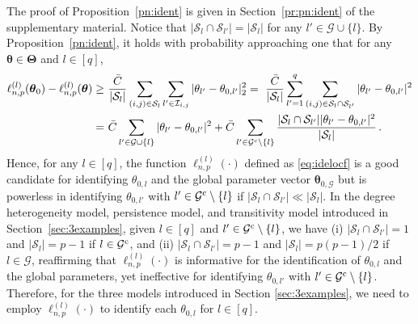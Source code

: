 \documentclass[12pt]{article}
\newcommand{\bTheta}{\boldsymbol \Theta}
\newcommand{\btheta}{\boldsymbol \theta}
\newcommand{\btc}{{\rm c}}
\newcommand{\0}{{\bf 0}}
\begin{document}
The proof of Proposition~\ref{pn:ident} is given in Section~\ref{pr:pn:ident} of the supplementary material.
Notice that $|\mathcal{S}_{ l}\cap\mathcal{S}_{l'}|=|\mathcal{S}_{ l}|$ for any $l' \in\mathcal{G} \cup \{l\}$.
By Proposition~\ref{pn:ident}, it holds with probability approaching one that for any $\btheta\in\bTheta$ and $l \in [q]$,
\begin{equation}\label{eq:ident}
    \begin{split}
        \ell_{n,p}^{(l)}(\btheta_0)-\ell_{n,p}^{(l)}(\btheta)\geq&~\frac{\bar C}{|\mathcal{S}_l|}\sum_{(i,j) \in \mathcal{S}_l}\sum_{l'\in\mathcal{I}_{i,j}}|\theta_{l'}-\theta_{0,l'}|_2^2
=~\frac{{\bar C}}{|\mathcal{S}_l|}\sum_{l'=1}^q\sum_{(i,j)\in\mathcal{S}_{l}\cap \mathcal{S}_{l'}}|\theta_{l'}-\theta_{0,l'}|^2\\
=&~{\bar C}\sum_{l'\in\mathcal{G}\cup\{l\}}|\theta_{l'}-\theta_{0,l'}|^2+{\bar C}\sum_{l'\in\mathcal{G}^{\btc} \setminus \{l\}}\frac{|\mathcal{S}_{l}\cap\mathcal{S}_{l'}||\theta_{l'}-\theta_{0,l'}|^2}{|\mathcal{S}_l|}\,.
    \end{split}
\end{equation}
 Hence, for any $l\in[q]$, the function  $\ell_{n,p}^{(l)}(\cdot)$ defined as \eqref{eq:idelocf} is a good candidate for identifying $\theta_{0,l}$ and the global parameter vector $\btheta_{0,\mathcal{G}}$ but is powerless in identifying $\theta_{0,l'}$ with $l'\in\mathcal{G}^{\btc}\setminus\{l\}$ if $|\mathcal{S}_l\cap\mathcal{S}_{l'}|\ll|\mathcal{S}_l|$. In the degree heterogeneity model, persistence model, and transitivity model introduced in Section~\ref{sec:3examples}, given   $l\in[q]$ and $l'\in\mathcal{G}^{\btc}\setminus\{l\}$, we have (i) 
 $|\mathcal{S}_l\cap\mathcal{S}_{l'}| = 1$ and $|\mathcal{S}_l| = p-1$ if $l \in\mathcal{G}^{\btc}$, and (ii) $|\mathcal{S}_l\cap\mathcal{S}_{l'}| = p-1$ and $|\mathcal{S}_l| = p(p-1)/2$ if  $l\in\mathcal{G}$, reaffirming  that   $\ell_{n,p}^{(l)}(\cdot)$  is informative for the identification of $\theta_{0,l}$ and the global parameters, yet ineffective for identifying $\theta_{0,l'}$ with $l'\in\mathcal{G}^{\btc}\setminus\{l\}$. Therefore, for the three models introduced in Section \ref{sec:3examples}, 
we need to employ $\ell_{n,p}^{(l)}(\cdot)$ to identify each $\theta_{0,l}$ for $l\in[q]$.
 
\end{document}
